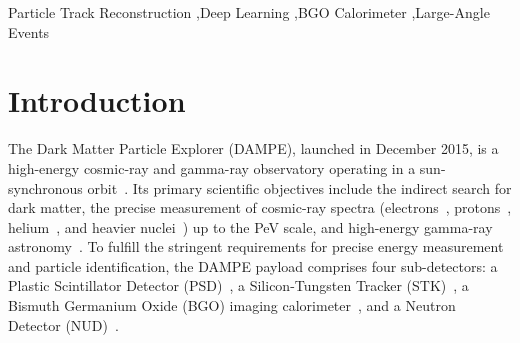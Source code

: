 \documentclass[preprint,12pt]{elsarticle}
\begin{document}
\begin{frontmatter}

\begin{keyword}
Particle Track Reconstruction \sep Deep Learning \sep BGO Calorimeter \sep Large-Angle Events
\end{keyword}

\end{frontmatter}



\section{Introduction}
\label{sec:intro}

The Dark Matter Particle Explorer (DAMPE), launched in December 2015, is a high-energy cosmic-ray and gamma-ray observatory operating in a sun-synchronous orbit~\cite{dampe_mission}. Its primary scientific objectives include the indirect search for dark matter, the precise measurement of cosmic-ray spectra (electrons~\cite{ambrosi_2017}, protons~\cite{an_2019}, helium~\cite{alemanno_helium_2021,alemanno_p_he_2024}, and heavier nuclei~\cite{alemanno_proton_iron_2025}) up to the PeV scale, and high-energy gamma-ray astronomy~\cite{li_2019}. To fulfill the stringent requirements for precise energy measurement and particle identification, the DAMPE payload comprises four sub-detectors: a Plastic Scintillator Detector (PSD)~\cite{dampe_psd_calib, dampe_psd_design, dong_2019, ma_2019}, a Silicon-Tungsten Tracker (STK)~\cite{dampe_stk_perf, dampe_stk_align, dampe_stk_design}, a Bismuth Germanium Oxide (BGO) imaging calorimeter~\cite{dampe_bgo_beam, dampe_bgo_calib, dampe_bgo_readout}, and a Neutron Detector (NUD)~\cite{dampe_nud}.
\end{document}
